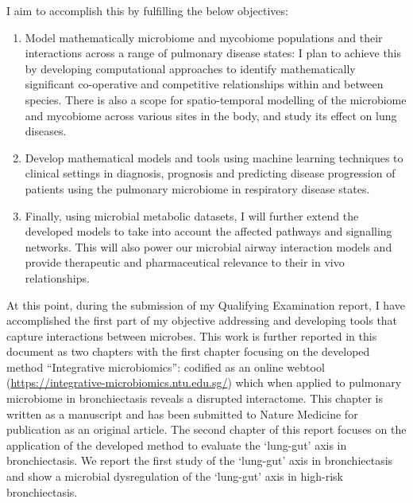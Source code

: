 I aim to accomplish this by fulfilling the below objectives: 
\begin{enumerate}
	\item Model mathematically microbiome and mycobiome populations and their interactions across a range of pulmonary disease states: I plan to achieve this by developing computational approaches to identify mathematically significant co-operative and competitive relationships within and between species. There is also a scope for spatio-temporal modelling of the microbiome and mycobiome across various sites in the body, and study its effect on lung diseases.
	\item Develop mathematical models and tools using machine learning techniques to clinical settings in diagnosis, prognosis and predicting disease progression of patients using the pulmonary microbiome in respiratory disease states.
	\item Finally, using microbial metabolic datasets, I will further extend the developed models to take into account the affected pathways and signalling networks. This will also power our microbial airway interaction models and provide therapeutic and pharmaceutical relevance to their in vivo relationships. 
\end{enumerate}

At this point, during the submission of my Qualifying Examination report, I have accomplished the first part of my objective addressing and developing tools that capture interactions between microbes. This work is further reported in this document as two chapters with the first chapter focusing on the developed method ``Integrative microbiomics'': codified as an online webtool (\url{https://integrative-microbiomics.ntu.edu.sg/})  which when applied to pulmonary microbiome in bronchiectasis reveals a disrupted interactome. This chapter is written as a manuscript and has been submitted to Nature Medicine for publication as an original article. The second chapter of this report focuses on the application of the developed method to evaluate the `lung-gut' axis in bronchiectasis. We report the first study of the `lung-gut' axis in bronchiectasis and show a microbial dysregulation of the ‘lung-gut’ axis in high-risk bronchiectasis. 